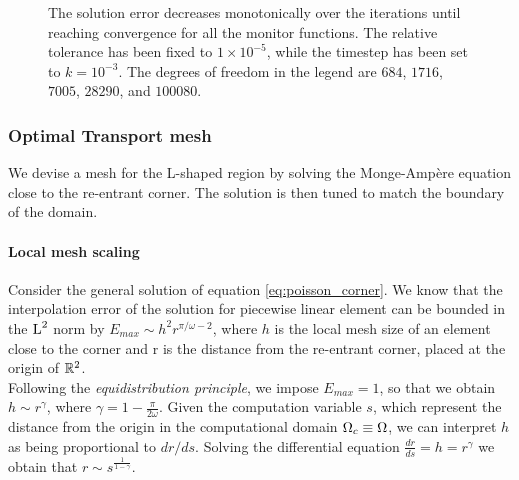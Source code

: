 \documentclass[a4paper,11pt]{article}
\begin{document}
\begin{figure}[h!]
{}
\caption{The solution error decreases monotonically over the iterations until reaching convergence for all the monitor functions. The relative tolerance has been fixed to $1\times10^{-5}$, while the timestep has been set to $k=10^{-3}$. The degrees of freedom in the legend are $684$, $1716$, $7005$, $28290$, and $100080$.}
\end{figure}

\clearpage
\newpage

\subsubsection{Optimal Transport mesh}
\label{sec:OT}

We devise a mesh for the L-shaped region by solving the Monge-Ampère equation close to the re-entrant corner. The solution is then tuned to match the boundary of the domain.


\paragraph{Local mesh scaling}

Consider the general solution of equation \eqref{eq:poisson_corner}. We know that the interpolation error of the solution for piecewise linear element can be bounded in the $\operatorname L^{2}$ norm by $E_{max} \sim h^{2} r^{\pi/\omega - 2}$, where $h$ is the local mesh size of an element close to the corner and r is the distance from the re-entrant corner, placed at the origin of $\mathbb R^{2}$.\\

Following the \textit{equidistribution principle}, we impose $E_{max} = 1$, so that we obtain $h \sim r^{\gamma}$, where $\gamma = 1 - \frac{\pi}{2\omega}$. Given the computation variable $s$, which represent the distance from the origin in the computational domain $\Omega_{c} \equiv \Omega$, we can interpret $h$ as being proportional to $dr/ds$. Solving the differential equation $\frac{dr}{ds} = h = r^{\gamma}$ we obtain that $r \sim s^{\frac{1}{1-\gamma}}$.
\end{document}
